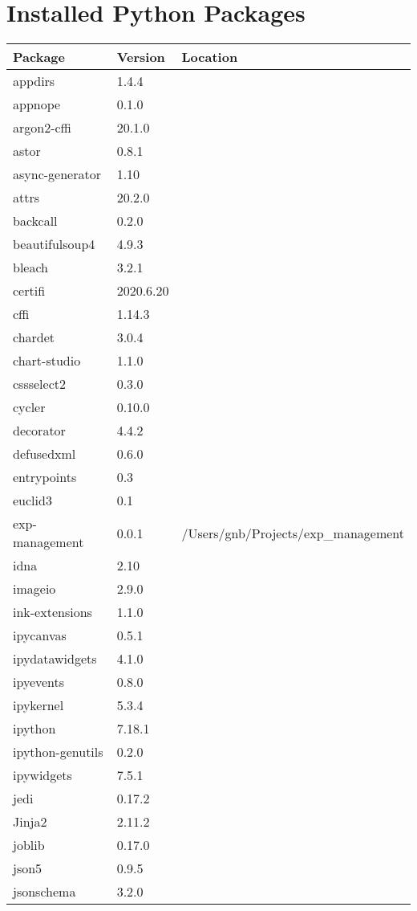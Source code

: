 \section{Installed Python Packages}

\begin{longtable}{|l|l|l|}
\hline
\textbf{Package} & \textbf{Version} & \textbf{Location} \\
\hline
appdirs & 1.4.4 & \\
appnope & 0.1.0 & \\
argon2-cffi & 20.1.0 & \\
astor & 0.8.1 & \\
async-generator & 1.10 & \\
attrs & 20.2.0 & \\
backcall & 0.2.0 & \\
beautifulsoup4 & 4.9.3 & \\
bleach & 3.2.1 & \\
certifi & 2020.6.20 & \\
cffi & 1.14.3 & \\
chardet & 3.0.4 & \\
chart-studio & 1.1.0 & \\
cssselect2 & 0.3.0 & \\
cycler & 0.10.0 & \\
decorator & 4.4.2 & \\
defusedxml & 0.6.0 & \\
entrypoints & 0.3 & \\
euclid3 & 0.1 & \\
exp-management & 0.0.1 & /Users/gnb/Projects/exp\_management \\
idna & 2.10 & \\
imageio & 2.9.0 & \\
ink-extensions & 1.1.0 & \\
ipycanvas & 0.5.1 & \\
ipydatawidgets & 4.1.0 & \\
ipyevents & 0.8.0 & \\
ipykernel & 5.3.4 & \\
ipython & 7.18.1 & \\
ipython-genutils & 0.2.0 & \\
ipywidgets & 7.5.1 & \\
jedi & 0.17.2 & \\
Jinja2 & 2.11.2 & \\
joblib & 0.17.0 & \\
json5 & 0.9.5 & \\
jsonschema & 3.2.0 & \\

\end{longtable}
